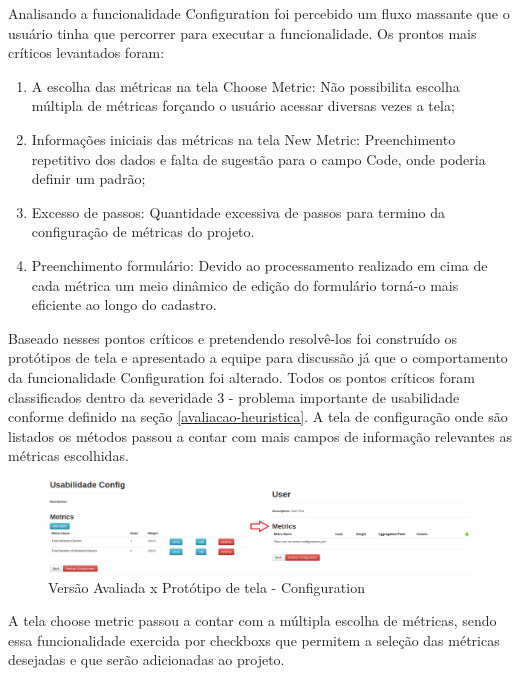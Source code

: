 Analisando a funcionalidade Configuration foi percebido um fluxo massante que o usuário tinha que percorrer para executar a funcionalidade. Os prontos mais críticos levantados foram:

\begin{enumerate}
\item A escolha das métricas na tela Choose Metric: Não possibilita escolha múltipla de métricas forçando o usuário acessar diversas vezes a tela;
\item Informações iniciais das métricas na tela New Metric: Preenchimento repetitivo dos dados e falta de sugestão para o campo Code, onde poderia definir um padrão;
\item Excesso de passos: Quantidade excessiva de passos para termino da configuração de métricas do projeto.
\item Preenchimento formulário: Devido ao processamento realizado em cima de cada métrica um meio dinâmico de edição do formulário torná-o mais eficiente ao longo do cadastro.
\end{enumerate}

Baseado nesses pontos críticos e pretendendo resolvê-los foi construído os protótipos de tela e apresentado a equipe para discussão já que o comportamento da funcionalidade Configuration foi alterado. Todos os pontos críticos foram classificados dentro da severidade 3 - problema importante de usabilidade conforme definido na seção \ref{avaliacao-heuristica}. A tela de configuração onde são listados os métodos passou a contar com mais campos de informação relevantes as métricas escolhidas.

\graphicspath{{figuras/}}
\begin{figure}[H]
\centering
\includegraphics[width=1.0\textwidth]{PrototipoConfig}
\caption{Versão Avaliada x Protótipo de tela - Configuration}
\label{parallel-coordinate}
\end{figure}

A tela choose metric passou a contar com a múltipla escolha de métricas, sendo essa funcionalidade exercida por checkboxs que permitem a seleção das métricas desejadas e que serão adicionadas ao projeto.

